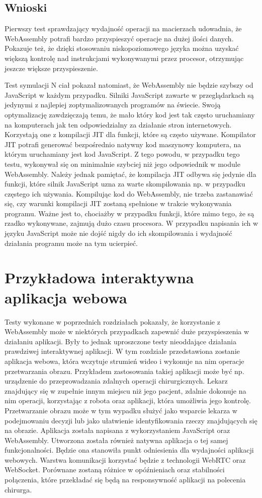 \documentclass[language=polish,type=master]{aghmodern}
\begin{document}
\section{Wnioski}
Pierwszy test sprawdzający wydajność operacji na macierzach udowadnia, że WebAssembly potrafi bardzo przyspieszyć operacje na dużej ilości danych.
Pokazuje też, że dzięki stosowaniu niskopoziomowego języka można uzyskać większą kontrolę nad instrukcjami wykonywanymi przez procesor, otrzymując jeszcze większe przyspieszenie.

Test symulacji N ciał pokazał natomiast, że WebAssembly nie będzie szybszy od JavaScript w każdym przypadku.
Silniki JavaScript zawarte w przeglądarkach są jedynymi z najlepiej zoptymalizowanych programów na świecie.
Swoją optymalizację zawdzięczają temu, że mało który kod jest tak często uruchamiany na komputerach jak ten odpowiedzialny za działanie stron internetowych.
Korzystają one z kompilacji JIT dla funkcji, które są często używane.
Kompilator JIT potrafi generować bezpośrednio natywny kod maszynowy komputera, na którym uruchamiany jest kod JavaScript.
Z tego powodu, w przypadku tego testu, wykonywał się on minimalnie szybciej niż jego odpowiednik w module WebAssembly.
Należy jednak pamiętać, że kompilacja JIT odbywa się jedynie dla funkcji, które silnik JavaScript uzna za warte skompilowania np. w przypadku częstego ich używania.
Kompilując kod do WebAssembly, nie trzeba zastanawiać się, czy warunki kompilacji JIT zostaną spełnione w trakcie wykonywania programu.
Ważne jest to, chociażby w przypadku funkcji, które mimo tego, że są rzadko wykonywane, zajmują dużo czasu procesora.
W przypadku napisania ich w języku JavaScript może nie dojść nigdy do ich skompilowania i wydajność działania programu może na tym ucierpieć.

\chapter{Przykładowa interaktywna aplikacja webowa}
Testy wykonane w poprzednich rozdziałach pokazały, że korzystanie z WebAssembly może w niektórych przypadkach zapewnić duże przyspieszenia w działaniu aplikacji.
Były to jednak uproszczone testy nieoddające działania prawdziwej interaktywnej aplikacji.
W tym rozdziale przedstawiona zostanie aplikacja webowa, która wczytuje strumień wideo i wykonuje na nim operacje przetwarzania obrazu.
Przykładem zastosowania takiej aplikacji może być np. urządzenie do przeprowadzania zdalnych operacji chirurgicznych.
Lekarz znajdujący się w zupełnie innym miejscu niż jego pacjent, zdalnie dokonuje na nim operacji, korzystając z robota oraz aplikacji, która umożliwia jego kontrolę.
Przetwarzanie obrazu może w tym wypadku służyć jako wsparcie lekarza w podejmowaniu decyzji lub jako ułatwienie identyfikowania rzeczy znajdujących się na obrazie.
Aplikacja została napisana z wykorzystaniem JavaScript oraz WebAssembly.
Utworzona została również natywna aplikacja o tej samej funkcjonalności.
Będzie ona stanowiła punkt odniesienia dla wydajności aplikacji webowych.
Warstwa komunikacji korzystać będzie z technologii WebRTC oraz WebSocket.
Porównane zostaną różnice w opóźnieniach oraz stabilności połączenia, które przekładać się będą na responsywność aplikacji na polecenia chirurga.
\end{document}
